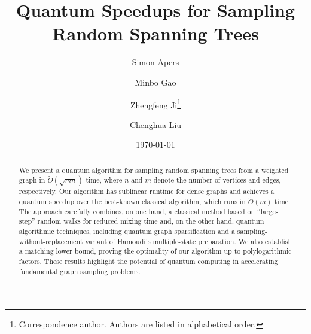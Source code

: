 \documentclass[11pt]{article}
\begin{document}
{\sloppy



\title{\Large\bf Quantum Speedups for Sampling Random Spanning Trees}
\renewcommand*{\Affilfont}{\small\itshape} \author[1]{Simon Apers}
\author[2,3]{Minbo Gao}
\author[4]{Zhengfeng Ji\thanks{Correspondence author. Authors are listed in alphabetical order.}}
\author[2,3]{Chenghua Liu}

\date{\today}

\maketitle

\begin{abstract}
  We present a quantum algorithm for sampling random spanning trees from a
  weighted graph in $\widetilde{O}(\sqrt{mn})$ time, where $n$ and $m$ denote
  the number of vertices and edges, respectively.
  Our algorithm has sublinear runtime for dense graphs and achieves a quantum
  speedup over the best-known classical algorithm, which runs in
  $\widetilde{O}(m)$ time.
  The approach carefully combines, on one hand, a classical method based on
  ``large-step'' random walks for reduced mixing time and, on the other hand,
  quantum algorithmic techniques, including quantum graph sparsification and a
  sampling-without-replacement variant of Hamoudi's multiple-state preparation.
  We also establish a matching lower bound, proving the optimality of our
  algorithm up to polylogarithmic factors.
  These results highlight the potential of quantum computing in accelerating
  fundamental graph sampling problems.
\end{abstract}


}
\end{document}
